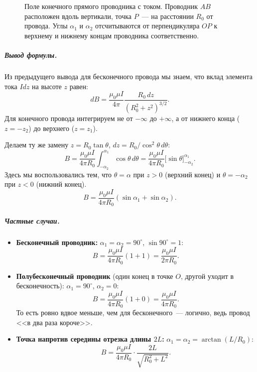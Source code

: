 \documentclass[12pt]{article}
\begin{document}
\begin{figure}[H]
\caption{Поле конечного прямого проводника с током. Проводник $AB$
расположен вдоль вертикали, точка $P$~--- на расстоянии $R_0$ от провода.
Углы $\alpha_1$ и $\alpha_2$ отсчитываются от перпендикуляра $OP$ к
верхнему и нижнему концам проводника соответственно.}
\label{fig:finite-wire}
\end{figure}

\subparagraph{Вывод формулы.}
Из предыдущего вывода для бесконечного провода мы знаем, что вклад элемента
тока $Idz$ на высоте $z$ равен:
\[
    dB = \frac{\mu_0\mu I}{4\pi}\frac{R_0\,dz}{(R_0^2 + z^2)^{3/2}}.
\]
Для конечного провода интегрируем не от $-\infty$ до $+\infty$, а от нижнего
конца ($z = -z_2$) до верхнего ($z = z_1$).

Делаем ту же замену $z = R_0\tan\theta$, $dz = R_0/\cos^2\theta\,d\theta$:
\[
    B = \frac{\mu_0\mu I}{4\pi R_0}
    \int_{-\alpha_2}^{\alpha_1}\cos\theta\,d\theta
    = \frac{\mu_0\mu I}{4\pi R_0}
    \Big[\sin\theta\Big]_{-\alpha_2}^{\alpha_1}.
\]
Здесь мы воспользовались тем, что $\theta = \alpha$ при $z > 0$ (верхний конец)
и $\theta = -\alpha_2$ при $z < 0$ (нижний конец).
\[
    \boxed{B = \frac{\mu_0\mu I}{4\pi R_0}(\sin\alpha_1 + \sin\alpha_2).}
\]

\subparagraph{Частные случаи.}
\begin{itemize}
    \item \textbf{Бесконечный проводник:}
          $\alpha_1 = \alpha_2 = 90^\circ$, $\sin 90^\circ = 1$:
          \[
              B = \frac{\mu_0\mu I}{4\pi R_0}(1 + 1) = \frac{\mu_0\mu I}{2\pi R_0}.
          \]
    \item \textbf{Полубесконечный проводник} (один конец в точке $O$, другой
          уходит в бесконечность):
          $\alpha_1 = 90^\circ$, $\alpha_2 = 0$:
          \[
              B = \frac{\mu_0\mu I}{4\pi R_0}(1 + 0) = \frac{\mu_0\mu I}{4\pi R_0}.
          \]
          То есть ровно вдвое меньше, чем для бесконечного~--- логично,
          ведь провод <<в два раза короче>>.
    \item \textbf{Точка напротив середины отрезка длины $2L$:}
          $\alpha_1 = \alpha_2 = \arctan(L/R_0)$:
          \[
              B = \frac{\mu_0\mu I}{4\pi R_0}\cdot
              \frac{2L}{\sqrt{R_0^2 + L^2}}.
          \]
\end{itemize}
\end{document}
